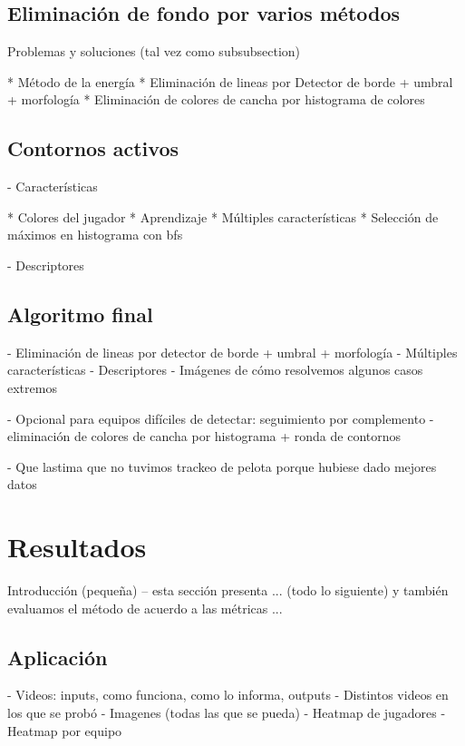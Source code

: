 \documentclass[a4paper,10pt]{article}
\begin{document}
\subsection{Eliminación de fondo por varios métodos}
\label{sec:background-elimination}
Problemas y soluciones (tal vez como subsubsection)

  * Método de la energía
  * Eliminación de lineas por Detector de borde + umbral + morfología
  * Eliminación de colores de cancha por histograma de colores

\subsection{Contornos activos}
\label{sec:ac}

- Características

  * Colores del jugador
  * Aprendizaje
  * Múltiples características
  * Selección de máximos en histograma con bfs

- Descriptores

\subsection{Algoritmo final}
\label{sec:alg-final}

- Eliminación de lineas por detector de borde + umbral + morfología
- Múltiples características
- Descriptores
- Imágenes de cómo resolvemos algunos casos extremos

- Opcional para equipos difíciles de detectar: seguimiento por complemento
  - eliminación de colores de cancha por histograma + ronda de contornos

- Que lastima que no tuvimos trackeo de pelota porque hubiese dado mejores datos

\section{Resultados}
\label{sec:resultados}

Introducción (pequeña) -- esta sección presenta ... (todo lo siguiente) y también evaluamos el método de acuerdo a las métricas ...

\subsection{Aplicación}
  - Videos: inputs, como funciona, como lo informa, outputs
  - Distintos videos en los que se probó
  - Imagenes (todas las que se pueda)
  - Heatmap de jugadores
  - Heatmap por equipo
\end{document}
